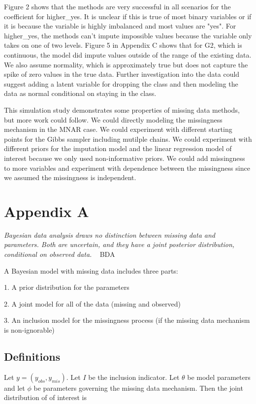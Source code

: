 \documentclass[11pt]{article}
\begin{document}
Figure 2 shows that the methods are very successful in all scenarios for the coefficient for higher\_yes. It is unclear if this is true of most binary variables or if it is because the variable is highly imbalanced and most values are "yes". For higher\_yes, the methods can't impute impossible values because the variable only takes on one of two levels. Figure 5 in Appendix C shows that for G2, which is continuous, the model did impute values outside of the range of the existing data. We also assume normality, which is approximately true but does not capture the spike of zero values in the true data. Further investigation into the data could suggest adding a latent variable for dropping the class and then modeling the data as normal conditional on staying in the class. 

This simulation study demonstrates some properties of missing data methods, but more work could follow. We could directly modeling the missingness mechanism in the MNAR case. We could experiment with different starting points for the Gibbs sampler including mutilple chains. We could experiment with different priors for the imputation model and the linear regression model of interest because we only used non-informative priors. We could add missingness to more variables and experiment with dependence between the missingness since we assumed the missingness is independent.  

\newpage
\section{Appendix A}

\textit{Bayesian data analysis draws no distinction between missing data and parameters. Both are uncertain, and they have a joint posterior distribution, conditional on observed data.} ~ BDA

A Bayesian model with missing data includes three parts:

1. A prior distribution for the parameters

2. A joint model for all of the data (missing and observed)

3. An inclusion model for the missingness process (if the missing data mechanism is non-ignorable)

\subsection{Definitions}

Let $y = (y_{obs}, y_{mis})$. Let $I$ be the inclusion indicator. Let $\theta$ be model parameters and let $\phi$ be parameters governing the missing data mechanism. Then the joint distribution of of interest is 
\end{document}
